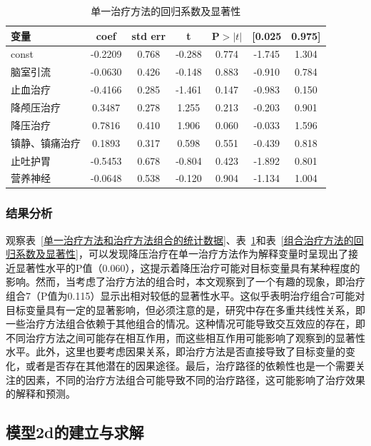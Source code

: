 \documentclass[bwprint]{gmcmthesis}
\begin{document}
\begin{table}[htbp]
  \centering
  \caption{单一治疗方法的回归系数及显著性}
   \label{单一治疗方法的回归系数及显著性}
    \begin{tabular}{lcccccc}
    \toprule
    变量 & coef & std err & t & P$>|t|$ & [0.025 & 0.975] \\
    \midrule
    const & -0.2209 & 0.768 & -0.288 & 0.774 & -1.745 & 1.304 \\
    脑室引流 & -0.0630 & 0.426 & -0.148 & 0.883 & -0.910 & 0.784 \\
    止血治疗 & -0.4166 & 0.285 & -1.461 & 0.147 & -0.983 & 0.150 \\
    降颅压治疗 & 0.3487 & 0.278 & 1.255 & 0.213 & -0.203 & 0.901 \\
    降压治疗 & 0.7816 & 0.410 & 1.906 & 0.060 & -0.033 & 1.596 \\
    镇静、镇痛治疗 & 0.1893 & 0.317 & 0.598 & 0.551 & -0.439 & 0.818 \\
    止吐护胃 & -0.5453 & 0.678 & -0.804 & 0.423 & -1.892 & 0.801 \\
    营养神经 & -0.0648 & 0.538 & -0.120 & 0.904 & -1.134 & 1.004 \\
    \bottomrule
    \end{tabular}%
\end{table}%

\subsubsection{结果分析}

观察表~\ref{单一治疗方法和治疗方法组合的统计数据}、表~\ref{单一治疗方法的回归系数及显著性}和表~\ref{组合治疗方法的回归系数及显著性}，可以发现降压治疗在单一治疗方法作为解释变量时呈现出了接近显著性水平的P值（0.060），这提示着降压治疗可能对目标变量具有某种程度的影响。然而，当考虑了治疗方法的组合时，本文观察到了一个有趣的现象，即治疗组合7（P值为0.115）显示出相对较低的显著性水平。这似乎表明治疗组合7可能对目标变量具有一定的显著影响，但必须注意的是，研究中存在多重共线性关系，即一些治疗方法组合依赖于其他组合的情况。这种情况可能导致交互效应的存在，即不同治疗方法之间可能存在相互作用，而这些相互作用可能影响了观察到的显著性水平。此外，这里也要考虑因果关系，即治疗方法是否直接导致了目标变量的变化，或者是否存在其他潜在的因果途径。最后，治疗路径的依赖性也是一个需要关注的因素，不同的治疗方法组合可能导致不同的治疗路径，这可能影响了治疗效果的解释和预测。

\subsection{模型2d的建立与求解}
\end{document}
